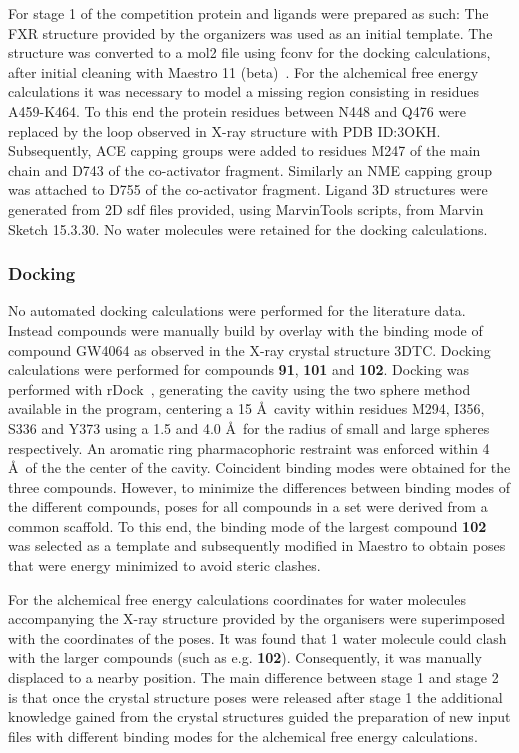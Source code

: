 \documentclass{svjour3}                     %
\begin{document}
For stage 1 of the competition protein and ligands were prepared as such: The FXR structure provided by the organizers was used as an initial template. The structure was converted to a mol2 file using fconv for the docking calculations, after initial cleaning with Maestro 11 (beta)~\cite{Maestro}. For the alchemical free energy calculations it was necessary to model a missing region consisting in residues A459-K464. To this end the protein residues between N448 and Q476 were replaced by the loop observed in X-ray structure with PDB ID:3OKH. Subsequently, ACE capping groups were added to residues M247 of the main chain and D743 of the co-activator fragment. Similarly an NME capping group was attached to D755 of the co-activator fragment.
Ligand 3D structures were generated from 2D sdf files provided, using MarvinTools scripts, from Marvin Sketch 15.3.30.
No water molecules were retained for the docking calculations.

\subsubsection{Docking}

No automated docking calculations were performed for the literature data. Instead compounds were manually build by overlay with the binding mode of compound GW4064 as observed in the X-ray crystal structure 3DTC.
Docking calculations were performed for compounds \textbf{91}, \textbf{101} and \textbf{102}. Docking was performed with rDock~\cite{Ruiz-CarmonaAlvarez-GarciaFoloppeEtAl2014}, generating the cavity using the two sphere method available in the program, centering a 15 \AA~cavity within residues M294, I356, S336 and Y373 using a 1.5 and 4.0 \AA~for the radius of small and large spheres respectively. An aromatic ring pharmacophoric restraint was enforced within 4 \AA~of the the center of the cavity.
Coincident binding modes were obtained for the three compounds. However, to minimize the differences between binding modes of the different compounds, poses for all compounds in a set were derived from a common scaffold. To this end, the binding mode of the largest compound \textbf{102} was selected as a template and subsequently modified in Maestro to obtain poses that were energy minimized to avoid steric clashes.

For the alchemical free energy calculations coordinates for water molecules accompanying the X-ray structure provided by
the organisers were superimposed with the coordinates of the poses. It was found that 1 water molecule could clash with the larger compounds (such as e.g. \textbf{102}). Consequently, it was manually displaced to a nearby position.
The main difference between stage 1 and stage 2 is that once the crystal structure poses were released after stage 1 the additional knowledge gained from the crystal structures guided the preparation of new input files with different binding modes for the alchemical free energy calculations. 
\end{document}
